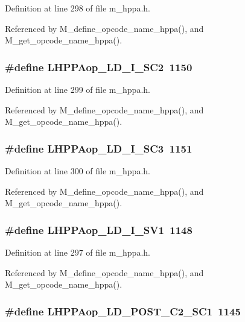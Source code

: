 Definition at line 298 of file m\_\-hppa.h.

Referenced by M\_\-define\_\-opcode\_\-name\_\-hppa(), and M\_\-get\_\-opcode\_\-name\_\-hppa().
\subsubsection{\setlength{\rightskip}{0pt plus 5cm}\#define LHPPAop\_\-LD\_\-I\_\-SC2~1150}\label{m__hppa_8h_9e7eea7e5dbcd3b9c2e671e96c2de317}




Definition at line 299 of file m\_\-hppa.h.

Referenced by M\_\-define\_\-opcode\_\-name\_\-hppa(), and M\_\-get\_\-opcode\_\-name\_\-hppa().
\subsubsection{\setlength{\rightskip}{0pt plus 5cm}\#define LHPPAop\_\-LD\_\-I\_\-SC3~1151}\label{m__hppa_8h_2bce27002ece35ad364198b1de0bc438}




Definition at line 300 of file m\_\-hppa.h.

Referenced by M\_\-define\_\-opcode\_\-name\_\-hppa(), and M\_\-get\_\-opcode\_\-name\_\-hppa().
\subsubsection{\setlength{\rightskip}{0pt plus 5cm}\#define LHPPAop\_\-LD\_\-I\_\-SV1~1148}\label{m__hppa_8h_47a98dc0e6edec1f606a4af6a2c4927f}




Definition at line 297 of file m\_\-hppa.h.

Referenced by M\_\-define\_\-opcode\_\-name\_\-hppa(), and M\_\-get\_\-opcode\_\-name\_\-hppa().
\subsubsection{\setlength{\rightskip}{0pt plus 5cm}\#define LHPPAop\_\-LD\_\-POST\_\-C2\_\-SC1~1145}\label{m__hppa_8h_4d3ceba67233b179d39caf5f7a1e4c8c}




